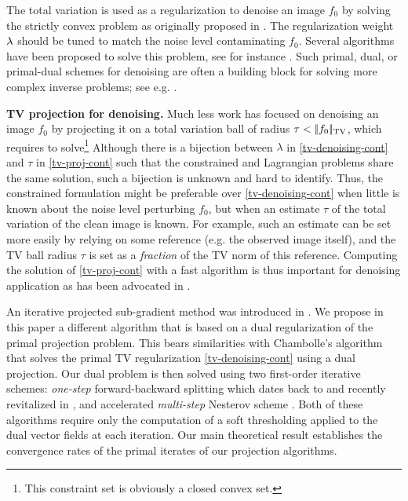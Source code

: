 \documentclass[11pt,nofonttune,a4paper]{IEEEtran}
\newcommand{\myparagraph}[1]{\vspace{2mm}\noindent\textbf{#1}}
\begin{document}
The total variation is used as a regularization to denoise an image $f_0$ by solving the strictly convex problem
as originally proposed in \cite{rudin-tv}. The regularization weight $\lambda$ should be tuned to match the noise level contaminating $f_0$.
Several algorithms have been proposed to solve this problem, see for instance \cite{goldfarb-socp-tv,chan-prima-dual-tv,zhu-primal-dual,vogel-iterative-tv,chambolle-algo-tv,weiss-tv-nesterov,AujolTV09,RodriguezTVIRLS09}. Such primal, dual, or primal-dual schemes for denoising are often a building block for solving more complex inverse problems; see e.g. \cite{wang-tv-split,bect-chambolle-iterative}.

\myparagraph{TV projection for denoising.} 
Much less work has focused on denoising an image $f_0$ by projecting it on a total variation ball of radius $\tau < |\!| f_0 |\!|_{\text{TV}}$, which requires to solve\footnote{This constraint set is obviously a closed convex set.}
Although there is a bijection between $\lambda$ in \eqref{tv-denoising-cont} and $\tau$ in \eqref{tv-proj-cont} such that the constrained and Lagrangian problems share the same solution, such a bijection is unknown and hard to identify. Thus, the constrained formulation might be preferable over \eqref{tv-denoising-cont} when little is known about the noise level perturbing $f_0$, but when an estimate $\tau$ of the total variation of the clean image is known. For example, such an estimate can be set more easily by relying on some reference (e.g. the observed image itself), and the TV ball radius $\tau$ is set as a {\textit{fraction}} of the TV norm of this reference. Computing the solution of \eqref{tv-proj-cont} with a fast algorithm is thus important for denoising application as has been advocated in \cite{combettes-pesquer-tv}.

An iterative projected sub-gradient method was introduced in \cite{combettes-block,combettes-pesquer-tv}. We propose in this paper a different algorithm that is based on a dual regularization of the primal projection problem. This bears similarities with Chambolle's algorithm \cite{chambolle-algo-tv} that solves the primal TV regularization \eqref{tv-denoising-cont} using a dual projection. Our dual problem is then solved using two first-order iterative schemes: \textit{one-step} forward-backward splitting which dates back to \cite{Gabay83,Tseng91} and recently revitalized in \cite{combettes-splitting}, and accelerated \textit{multi-step} Nesterov scheme \cite{nesterov-gradient}. Both of these algorithms require only the computation of a soft thresholding applied to the dual vector fields at each iteration. Our main theoretical result establishes the convergence rates of the primal iterates of our projection algorithms.
\end{document}
